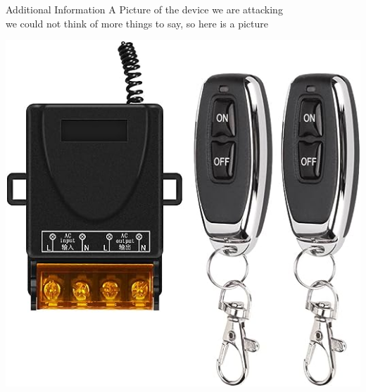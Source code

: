 \documentclass{beamer}
\begin{document}
\begin{frame}{Additional Information}
A Picture of the device we are attacking\\
we could not think of more things to say, so here is a picture

\begin{center}
    \includegraphics[width=0.6\linewidth]{./img/device.jpg}
\end{center}

\end{frame}
\end{document}
